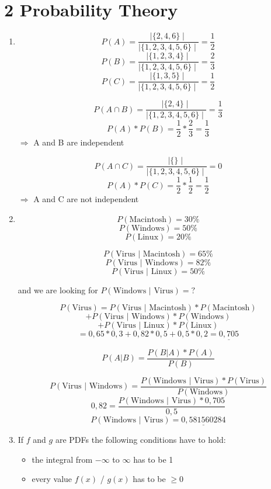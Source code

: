 \documentclass[12pt]{article}
\begin{document}
\section*{2 Probability Theory}
\begin{enumerate}[1)]
    \item 
        $$ P(A)= \frac{\mid \{2,4,6\} \mid}{\mid \{1,2,3,4,5,6\} \mid} = \frac{1}{2}$$ 
        $$ P(B)= \frac{\mid \{1,2,3,4\} \mid}{\mid \{1,2,3,4,5,6\} \mid} = \frac{2}{3}$$ 
        $$ P(C)= \frac{\mid \{1,3,5\} \mid}{\mid \{1,2,3,4,5,6\} \mid} = \frac{1}{2}$$ 
        
        $$ P(A \cap B)= \frac{\mid \{2,4\} \mid}{\mid \{1,2,3,4,5,6\} \mid} = \frac{1}{3}$$ 
        $$ P(A) * P(B) = \frac{1}{2} * \frac{2}{3} = \frac{1}{3} $$
        $ \Rightarrow $ A and B are independent
        
        $$ P(A \cap C)= \frac{\mid \{\} \mid}{\mid \{1,2,3,4,5,6\} \mid} = 0$$ 
        $$ P(A) * P(C) = \frac{1}{2} * \frac{1}{2} = \frac{1}{2} $$
        $ \Rightarrow $ A and C are not independent
        
    \item
        $$ P(\text{Macintosh}) = 30\% $$
        $$ P(\text{Windows})= 50\% $$
        $$ P(\text{Linux})= 20\% $$

        $$ P( \text{Virus } \vert \text{ Macintosh}) = 65\% $$
        $$ P( \text{Virus } \vert \text{ Windows}) = 82\% $$
        $$ P( \text{Virus } \vert \text{ Linux}) = 50\% $$

        and we are looking for $P(\text{Windows } \vert \text{ Virus}) = \text{?}$

        $$ P( \text{Virus}) = P( \text{Virus } \vert \text{ Macintosh}) * P( \text{Macintosh}) $$
        $$+ P( \text{Virus } \vert \text{ Windows}) * P( \text{Windows}) $$
        $$+ P( \text{Virus } \vert \text{ Linux}) * P( \text{Linux}) $$
        $$ = 0,65*0,3 + 0,82*0,5 + 0,5 * 0,2 = \underline{0,705} $$

        $$ P(A \vert B) = \frac{P(B \vert A) * P(A)}{P(B)} $$

        $$ P( \text{Virus } \vert \text{ Windows}) = \frac{ P( \text{Windows } \vert \text{ Virus}) * P( \text{Virus})}{P( \text{Windows})} $$
        $$ 0,82 = \frac{ P( \text{Windows } \vert \text{ Virus}) * 0,705}{0,5}$$
        $$ P( \text{Windows } \vert \text{ Virus}) = \underline{0,581560284} $$

    \item
        If $f$ and $g$ are PDFs the following conditions have to hold:
        \begin{itemize}
            \item 
                the integral from $-\infty$ to $\infty$ has to be 1
            \item
                every value $f(x)$ / $g(x)$ has to be $\geq 0$
        \end{itemize}


\end{enumerate}
\end{document}
